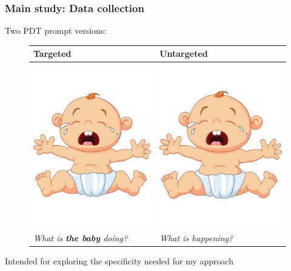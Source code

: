 \documentclass[handout,xcolor={dvipsnames}]{beamer}
\begin{document}
\begin{frame}
\frametitle{Main study: Data collection}

Two PDT prompt versions:
\begin{figure}[htb!]
\begin{center}
\begin{tabular}{|C{50mm}|C{50mm}|}
\hline
\textbf{Targeted} & \textbf{Untargeted} \\
\hline
{\includegraphics[trim=0 50 0 50,clip,width=0.33\columnwidth]{figures/I10.jpg}} & {\includegraphics[trim=0 50 0 50,clip,width=0.33\columnwidth]{figures/I10.jpg}} \\
\hline
\textit{What is \textbf{the baby} doing?} & \textit{What is happening?} \\
\hline
\end{tabular}
\end{center}
\end{figure}

Intended for exploring the specificity needed for my approach

\end{frame}
\end{document}

